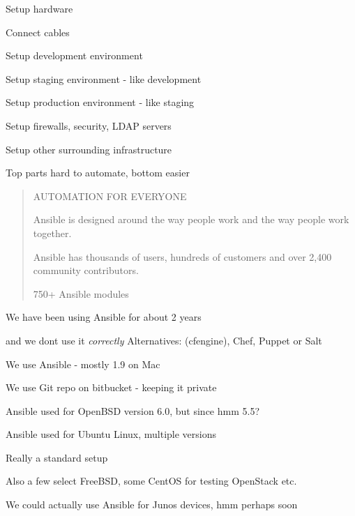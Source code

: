 \documentclass[18pt,landscape,a4paper,footrule]{foils}
\begin{document}

\begin{list2}
\item Setup hardware
\item Connect cables
\vskip 1cm
\item Setup development environment
\item Setup staging environment - like development
\item Setup production environment - like staging
\item Setup firewalls, security, LDAP servers
\item Setup other surrounding infrastructure
\end{list2}

\vskip 5mm
\centerline{Top parts hard to automate, bottom easier \smiley}




\begin{quote}\small
AUTOMATION FOR EVERYONE

Ansible is designed around the way people work and the way people work together.

Ansible has thousands of users, hundreds of customers and over 2,400 community contributors.

750+ Ansible modules
\end{quote}


\vskip 2cm
\centerline{We have been using Ansible for about 2 years}

and we dont use it \emph{correctly}
\vskip 2cm
Alternatives: (cfengine), Chef, Puppet or Salt


\begin{list2}
\item We use Ansible - mostly 1.9 on Mac
\item We use Git repo on bitbucket - keeping it private
\item Ansible used for OpenBSD version 6.0, but since hmm 5.5?
\item Ansible used for Ubuntu Linux, multiple versions
\item Really a standard setup
\item Also a few select FreeBSD, some CentOS for testing OpenStack etc.
\item We could actually use Ansible for Junos devices, hmm perhaps soon \smiley
\end{list2}
\end{document}
